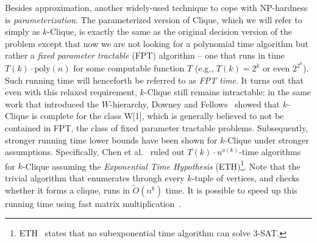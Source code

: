 \documentclass[11pt]{article}
\newcommand{\poly}{\text{poly}}
\renewcommand{\tilde}{\widetilde}
\begin{document}
Besides approximation, another widely-used technique to cope with NP-hardness is \emph{parameterization}. The parameterized version of Clique, which we will refer to simply as $k$-Clique, is exactly the same as the original decision version of the problem except that now we are not looking for a polynomial time algorithm but rather a {\em fixed parameter tractable} (FPT) algorithm -- one that runs in time $T(k)\cdot \poly(n)$ for some computable function $T$ (e.g., $T(k) = 2^k$ or even $2^{2^k}$). Such running time will henceforth be referred to as \emph{FPT time}. It turns out that even with this relaxed requirement, $k$-Clique still remains intractable: in the same work that introduced the $W$-hierarchy, Downey and Fellows~\cite{DF95} showed that $k$-Clique is complete for the class W[1], which is generally believed to not be contained in FPT, the class of fixed parameter tractable problems. Subsequently, stronger running time lower bounds have been shown for $k$-Clique under stronger assumptions. Specifically, Chen et al.~\cite{CHKX06a,CHKX06b} ruled out $T(k) \cdot n^{o(k)}$-time algorithms for $k$-Clique assuming the {\em Exponential Time Hypothesis} (ETH)\footnote{ETH~\cite{IP01,IPZ01} states that no subexponential time algorithm can solve 3-SAT.}.  Note that the trivial algorithm that enumerates through every $k$-tuple of vertices, and checks whether it forms a clique, runs in $\tilde{O}(n^{k})$ time. It is possible to speed up this running time using fast matrix multiplication~\cite{NP85,EG04}. 
\end{document}
